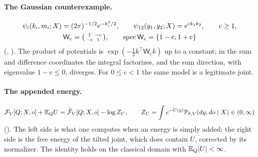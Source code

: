 \paragraph{The Gaussian counterexample.}
\begin{gather*}
\psi_i(k_i,m_i;X)=(2\pi)^{-1/2}e^{-k_i^2/2},
\qquad
\psi_{12}(y_1,y_2;X)=e^{\mathrm ck_1k_2},
\qquad
\mathrm c\geq1,\\
\mathsf W_{\mathrm c}=\begin{psmallmatrix}1&-\mathrm c\\-\mathrm c&1\end{psmallmatrix},
\qquad
\operatorname{spec}\mathsf W_{\mathrm c}=\{1-\mathrm c,1+\mathrm c\}
\end{gather*}
(, ). The product of potentials is
$\exp(-\tfrac12k^\top\mathsf W_{\mathrm c}k)$ up to a constant; in the sum and difference coordinates the integral
factorizes, and the sum direction, with eigenvalue $1-\mathrm c\leq0$, diverges. For $0\leq\mathrm c<1$ the same
model is a legitimate joint.

\paragraph{The appended energy.}
\[
\mathcal F_V[Q;X,o]+\mathbb E_QU=\widetilde{\mathcal F}_V[Q;X,o]-\log Z_U,
\qquad
Z_U=\int e^{-U(y)}\mathbb P_{\theta,V}(dy,do\mid X)\in(0,\infty)
\]
(). The left side is what one computes when an energy is simply added; the right side
is the free energy of the tilted joint, which does contain $U$, corrected by its normalizer. The identity holds on
the classical domain with $\mathbb E_Q\lvert U\rvert<\infty$.


